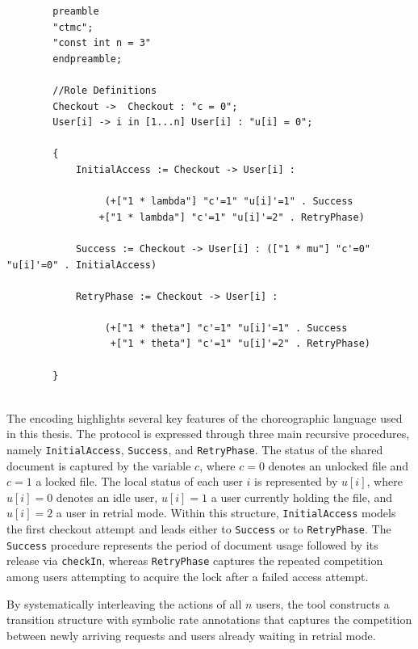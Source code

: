 \begin{listing}[ht]
	\begin{verbatim}
		preamble
		"ctmc";
		"const int n = 3"
		endpreamble;
		
		//Role Definitions
		Checkout ->  Checkout : "c = 0";
		User[i] -> i in [1...n] User[i] : "u[i] = 0";
		
		{
			InitialAccess := Checkout -> User[i] : 
			
				 (+["1 * lambda"] "c'=1" "u[i]'=1" . Success
			    +["1 * lambda"] "c'=1" "u[i]'=2" . RetryPhase)
			
			Success := Checkout -> User[i] : (["1 * mu"] "c'=0" "u[i]'=0" . InitialAccess)
			
			RetryPhase := Checkout -> User[i] : 
			
			     (+["1 * theta"] "c'=1" "u[i]'=1" . Success
			      +["1 * theta"] "c'=1" "u[i]'=2" . RetryPhase)
			
		}
		
		\end{verbatim}
	\caption{The modified ThinkTeam protocol in the choreography syntax}
	\label{lst:thinkteam}
	\end{listing}
The encoding highlights several key features of the choreographic language used in this thesis. The protocol is expressed through three main recursive procedures, namely \texttt{InitialAccess}, \texttt{Success}, and \texttt{RetryPhase}. The status of the shared document is captured by the variable $c$, where $c = 0$ denotes an unlocked file and $c = 1$ a locked file. The local status of each user $i$ is represented by $u[i]$, where $u[i] = 0$ denotes an idle user, $u[i] = 1$ a user currently holding the file, and $u[i] = 2$ a user in retrial mode. Within this structure, \texttt{InitialAccess} models the first checkout attempt and leads either to \texttt{Success} or to \texttt{RetryPhase}. The \texttt{Success} procedure represents the period of document usage followed by its release via \texttt{checkIn}, whereas \texttt{RetryPhase} captures the repeated competition among users attempting to acquire the lock after a failed access attempt.

By systematically interleaving the actions of all $n$ users, the tool constructs a transition structure with symbolic rate annotations that captures the competition between newly arriving requests and users already waiting in retrial mode.

